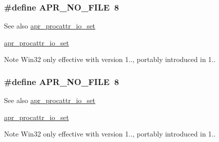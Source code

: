 \subsubsection[{\texorpdfstring{A\+P\+R\+\_\+\+N\+O\+\_\+\+F\+I\+LE}{APR_NO_FILE}}]{\setlength{\rightskip}{0pt plus 5cm}\#define A\+P\+R\+\_\+\+N\+O\+\_\+\+F\+I\+LE~8}\hypertarget{group__apr__thread__proc_ga597fb6a501c20cc3a597fe6c613f4310}{}\label{group__apr__thread__proc_ga597fb6a501c20cc3a597fe6c613f4310}
\begin{DoxySeeAlso}{See also}
\hyperlink{group__apr__thread__proc_ga2b1598bc6f5ab0bfcf2e55096d563c98}{apr\+\_\+procattr\+\_\+io\+\_\+set}

\hyperlink{group__apr__thread__proc_ga2b1598bc6f5ab0bfcf2e55096d563c98}{apr\+\_\+procattr\+\_\+io\+\_\+set} 
\end{DoxySeeAlso}
\begin{DoxyNote}{Note}
Win32 only effective with version 1.., portably introduced in 1.. 
\end{DoxyNote}
\subsubsection[{\texorpdfstring{A\+P\+R\+\_\+\+N\+O\+\_\+\+F\+I\+LE}{APR_NO_FILE}}]{\setlength{\rightskip}{0pt plus 5cm}\#define A\+P\+R\+\_\+\+N\+O\+\_\+\+F\+I\+LE~8}\hypertarget{group__apr__thread__proc_ga597fb6a501c20cc3a597fe6c613f4310}{}\label{group__apr__thread__proc_ga597fb6a501c20cc3a597fe6c613f4310}
\begin{DoxySeeAlso}{See also}
\hyperlink{group__apr__thread__proc_ga2b1598bc6f5ab0bfcf2e55096d563c98}{apr\+\_\+procattr\+\_\+io\+\_\+set}

\hyperlink{group__apr__thread__proc_ga2b1598bc6f5ab0bfcf2e55096d563c98}{apr\+\_\+procattr\+\_\+io\+\_\+set} 
\end{DoxySeeAlso}
\begin{DoxyNote}{Note}
Win32 only effective with version 1.., portably introduced in 1.. 
\end{DoxyNote}

